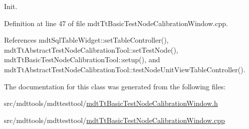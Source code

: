 Init. 



Definition at line 47 of file mdt\-Tt\-Basic\-Test\-Node\-Calibration\-Window.\-cpp.



References mdt\-Sql\-Table\-Widget\-::set\-Table\-Controller(), mdt\-Tt\-Abstract\-Test\-Node\-Calibration\-Tool\-::set\-Test\-Node(), mdt\-Tt\-Basic\-Test\-Node\-Calibration\-Tool\-::setup(), and mdt\-Tt\-Abstract\-Test\-Node\-Calibration\-Tool\-::test\-Node\-Unit\-View\-Table\-Controller().



The documentation for this class was generated from the following files\-:\begin{DoxyCompactItemize}
\item 
src/mdttools/mdttesttool/\hyperlink{mdt_tt_basic_test_node_calibration_window_8h}{mdt\-Tt\-Basic\-Test\-Node\-Calibration\-Window.\-h}\item 
src/mdttools/mdttesttool/\hyperlink{mdt_tt_basic_test_node_calibration_window_8cpp}{mdt\-Tt\-Basic\-Test\-Node\-Calibration\-Window.\-cpp}\end{DoxyCompactItemize}
